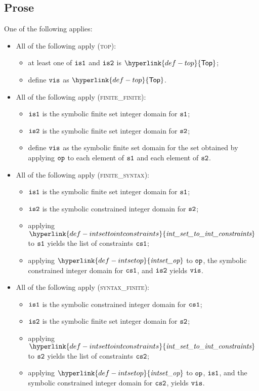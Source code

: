 \documentclass{book}
\newcommand\Top[0]{\hyperlink{def-top}{\textsf{Top}}}
\newcommand\intsetop[0]{\hyperlink{def-intsetop}{\textfunc{intset\_op}}}
\newcommand\intsettointconstraints[0]{\hyperlink{def-intsettointconstraints}{\textfunc{int\_set\_to\_int\_constraints}}}
\begin{document}
\subsection{Prose}
One of the following applies:
\begin{itemize}
  \item All of the following apply (\textsc{top}):
  \begin{itemize}
    \item at least one of $\texttt{is1}$ and $\texttt{is2}$ is $\Top$;
    \item define $\texttt{vis}$ as $\Top$.
  \end{itemize}

  \item All of the following apply (\textsc{finite\_finite}):
  \begin{itemize}
    \item $\texttt{is1}$ is the symbolic finite set integer domain for $\texttt{s1}$;
    \item $\texttt{is2}$ is the symbolic finite set integer domain for $\texttt{s2}$;
    \item define $\texttt{vis}$ as the symbolic finite set domain for the set obtained
          by applying $\texttt{op}$ to each element of $\texttt{s1}$ and each element of $\texttt{s2}$.
  \end{itemize}

  \item All of the following apply (\textsc{finite\_syntax}):
  \begin{itemize}
    \item $\texttt{is1}$ is the symbolic finite set integer domain for $\texttt{s1}$;
    \item $\texttt{is2}$ is the symbolic constrained integer domain for $\texttt{s2}$;
    \item applying $\intsettointconstraints$ to $\texttt{s1}$ yields the list of constraints $\texttt{cs1}$;
    \item applying $\intsetop$ to $\texttt{op}$, the symbolic constrained integer domain for $\texttt{cs1}$,
          and $\texttt{is2}$ yields $\texttt{vis}$.
  \end{itemize}

  \item All of the following apply (\textsc{syntax\_finite}):
  \begin{itemize}
    \item $\texttt{is1}$ is the symbolic constrained integer domain for $\texttt{cs1}$;
    \item $\texttt{is2}$ is the symbolic finite set integer domain for $\texttt{s2}$;
    \item applying $\intsettointconstraints$ to $\texttt{s2}$ yields the list of constraints $\texttt{cs2}$;
    \item applying $\intsetop$ to $\texttt{op}$, $\texttt{is1}$, and the symbolic constrained integer domain
          for $\texttt{cs2}$, yields $\texttt{vis}$.
  \end{itemize}


\end{itemize}
\end{document}
